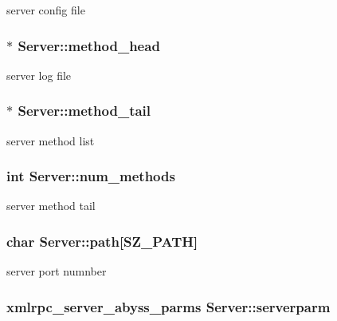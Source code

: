 server config file \hypertarget{structServer_0d3f35225f9d2bcb9350016948e77ada}{
\subsubsection[{method\_\-head}]{$\ast$ {\bf Server::method\_\-head}}}
\label{structServer_0d3f35225f9d2bcb9350016948e77ada}


server log file \hypertarget{structServer_baf5367f677cc45e2b46d08989a068e4}{
\subsubsection[{method\_\-tail}]{$\ast$ {\bf Server::method\_\-tail}}}
\label{structServer_baf5367f677cc45e2b46d08989a068e4}


server method list \hypertarget{structServer_fd95ab28088415ee5900bd6bf70dc0a2}{
\subsubsection[{num\_\-methods}]{\setlength{\rightskip}{0pt plus 5cm}int {\bf Server::num\_\-methods}}}
\label{structServer_fd95ab28088415ee5900bd6bf70dc0a2}


server method tail \hypertarget{structServer_3e5bdf6e881fe987617dbbe420ed39a7}{
\subsubsection[{path}]{\setlength{\rightskip}{0pt plus 5cm}char {\bf Server::path}\mbox{[}SZ\_\-PATH\mbox{]}}}
\label{structServer_3e5bdf6e881fe987617dbbe420ed39a7}


server port numnber \hypertarget{structServer_62bc9dc3ae8328ac0781cc3c7cbe148c}{
\subsubsection[{serverparm}]{\setlength{\rightskip}{0pt plus 5cm}xmlrpc\_\-server\_\-abyss\_\-parms {\bf Server::serverparm}}}
\label{structServer_62bc9dc3ae8328ac0781cc3c7cbe148c}


